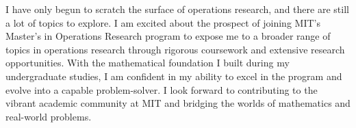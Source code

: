 \documentclass[12pt]{article}
\begin{document}
I have only begun to scratch the surface of operations research, and there are still a lot of topics
to explore. I am excited about the prospect of joining MIT's Master's in Operations Research program
to expose me to a broader range of topics in operations research through rigorous coursework and
extensive research opportunities. With the mathematical foundation I built during my undergraduate
studies, I am confident in my ability to excel in the program and evolve into a capable
problem-solver. I look forward to contributing to the vibrant academic community at MIT and bridging
the worlds of mathematics and real-world problems.

\newpage



\end{document}
